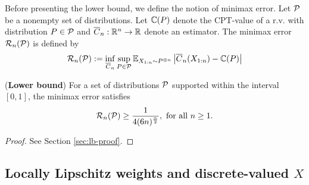 Before presenting the lower bound, we define the notion of minimax error. 
Let $\mathcal{P}$ be a nonempty set of distributions. Let $\mathbb{C}(P)$ denote the CPT-value of a r.v. with distribution $P \in \mathcal{P}$ and $\overline C_n:\mathbb{R}^n \to \mathbb{R}$ denote an estimator. The minimax error $\mathcal{R}_n(\mathcal{P})$ is defined by
\begin{align}
 \mathcal{R}_n(\mathcal{P}) := \inf_{\overline C_n} \sup_{P \in \mathcal{P}} \mathbb{E}_{X_{1:n} \sim P^{\otimes n}} \left| \overline C_n(X_{1:n}) - \mathbb{C}(P) \right| 
\end{align}


\begin{proposition}(\textbf{Lower bound})
	\label{prop:lower-bound}
For a set of distributions $\mathcal{P}$ supported within the interval $[0,1]$,  the minimax error satisfies 
$$ \mathcal{R}_n(\mathcal{P}) \ge \frac1{4(6n)^{\frac{\alpha}{2}}}, \text{ for all } n\ge1.$$
\end{proposition}
\begin{proof}
	See Section \ref{sec:lb-proof}.
\end{proof}


\subsection{Locally Lipschitz weights and discrete-valued $X$}

